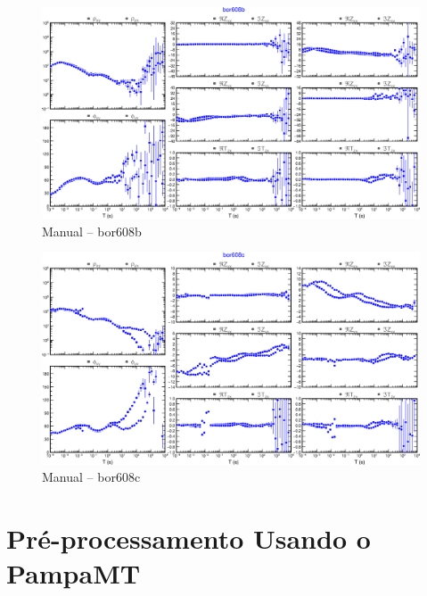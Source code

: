     \begin{figure}[H]
        \caption{Manual -- bor608b}
            \begin{center}
                \includegraphics[width=16cm]{texto/figura/sites/M-bor608b.png}
            \end{center}
    \end{figure}
    
    \begin{figure}[H]
        \caption{Manual -- bor608c}
            \begin{center}
                \includegraphics[width=16cm]{texto/figura/sites/M-bor608c.png}
            \end{center}
    \end{figure}
    
\chapter{Pré-processamento Usando o PampaMT}

